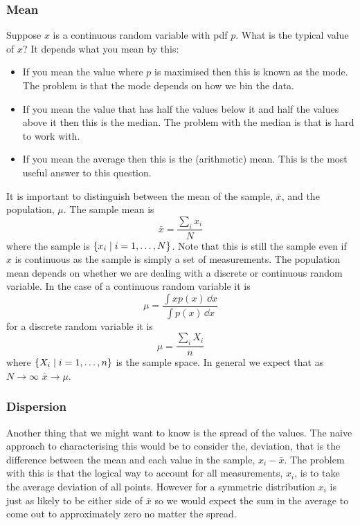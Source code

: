     \subsubsection{Mean}
    Suppose \(x\) is a continuous random variable with \acrshort{pdf} \(p\).
    What is the typical value of \(x\)?
    It depends what you mean by this:
    \begin{itemize}
        \item If you mean the value where \(p\) is maximised then this is known as the mode.
        The problem is that the mode depends on how we bin the data.
        \item If you mean the value that has half the values below it and half the values above it then this is the median.
        The problem with the median is that is hard to work with.
        \item If you mean the average then this is the (arithmetic) mean.
        This is the most useful answer to this question.
    \end{itemize}
    It is important to distinguish between the mean of the sample, \(\bar{x}\), and the population, \(\mu\).
    The sample mean is
    \[\bar{x} = \frac{\sum_i x_i}{N}\]
    where the sample is \(\{x_i\mid i=1, \dotsc, N\}\).
    Note that this is still the sample even if \(x\) is continuous as the sample is simply a set of measurements.
    The population mean depends on whether we are dealing with a discrete or continuous random variable.
    In the case of a continuous random variable it is
    \[\mu = \frac{\int xp(x)\,\dd{x}}{\int p(x)\,\dd{x}}\]
    for a discrete random variable it is
    \[\mu = \frac{\sum_i X_i}{n}\]
    where \(\{X_i\mid i = 1, \dotsc, n\}\) is the sample space.
    In general we expect that as \(N \to \infty\) \(\bar{x} \to \mu\).
    
    \subsubsection{Dispersion}
    Another thing that we might want to know is the spread of the values.
    The naive approach to characterising this would be to consider the, deviation, that is the difference between the mean and each value in the sample, \(x_i - \bar{x}\).
    The problem with this is that the logical way to account for all measurements, \(x_i\), is to take the average deviation of all points.
    However for a symmetric distribution \(x_i\) is just as likely to be either side of \(\bar{x}\) so we would expect the sum in the average to come out to approximately zero no matter the spread.
    
